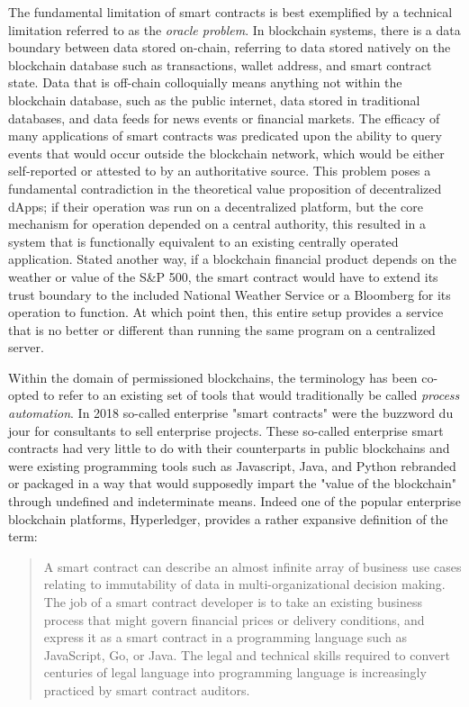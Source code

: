 The fundamental limitation of smart contracts is best exemplified by a technical
limitation referred to as the \textit{oracle problem}. In blockchain systems, there is
a data boundary between data stored on-chain, referring to data stored natively
on the blockchain database such as transactions, wallet address, and smart
contract state. Data that is off-chain colloquially means anything not within
the blockchain database, such as the public internet, data stored in traditional
databases, and data feeds for news events or financial markets. The efficacy of
many applications of smart contracts was predicated upon the ability to query
events that would occur outside the blockchain network, which would be either
self-reported or attested to by an authoritative source. This problem poses a
fundamental contradiction in the theoretical value proposition of decentralized
dApps; if their operation was run on a decentralized platform, but the core
mechanism for operation depended on a central authority, this resulted in a
system that is functionally equivalent to an existing centrally operated
application. Stated another way, if a blockchain financial product depends on
the weather or value of the S\&P 500, the smart contract would have to extend its
trust boundary to the included National Weather Service or a Bloomberg for its
operation to function. At which point then, this entire setup provides a service
that is no better or different than running the same program on a centralized
server.


Within the domain of permissioned blockchains, the terminology has been co-opted
to refer to an existing set of tools that would traditionally be called
\textit{process automation}. In 2018 so-called enterprise "smart contracts" were
the buzzword du jour for consultants to sell enterprise projects. These
so-called enterprise smart contracts had very little to do with their
counterparts in public blockchains and were existing programming tools such as
Javascript, Java, and Python rebranded or packaged in a way that would
supposedly impart the "value of the blockchain" through undefined and
indeterminate means. Indeed one of the popular enterprise blockchain platforms,
Hyperledger, provides a rather expansive definition of the term:
\cite{fabric2017hyperledger}

\begin{quote}
A smart contract can describe an almost infinite array of business use
cases relating to immutability of data in multi-organizational decision
making. The job of a smart contract developer is to take an existing
business process that might govern financial prices or delivery
conditions, and express it as a smart contract in a programming language
such as JavaScript, Go, or Java. The legal and technical skills required
to convert centuries of legal language into programming language is
increasingly practiced by smart contract auditors.
\end{quote}

